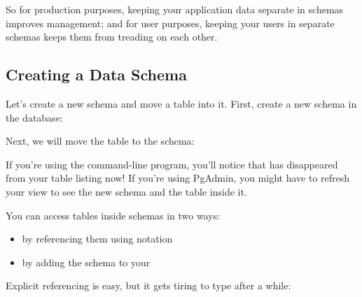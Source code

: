 \documentclass[a4paper,11pt,english]{sphinxmanual}
\begin{document}
So for production purposes, keeping your application data separate in schemas improves management; and for user purposes, keeping your users in separate schemas keeps them from treading on each other.


\subsection{Creating a Data Schema}
\label{\detokenize{maintenance:creating-a-data-schema}}
Let’s create a new schema and move a table into it.  First, create a new schema in the database:

\begin{sphinxVerbatim}[commandchars=\\\{\}]
  
\end{sphinxVerbatim}

Next, we will move the  table to the  schema:

\begin{sphinxVerbatim}[commandchars=\\\{\}]
     
\end{sphinxVerbatim}

If you’re using the  command-line program, you’ll notice that  has disappeared from your table listing now! If you’re using PgAdmin, you might have to refresh your view to see the new schema and the table inside it.

You can access tables inside schemas in two ways:
\begin{itemize}
\item {} 
by referencing them using  notation

\item {} 
by adding the schema to your 

\end{itemize}

Explicit referencing is easy, but it gets tiring to type after a while:

\begin{sphinxVerbatim}[commandchars=\\\{\}]
     
\end{sphinxVerbatim}
\end{document}
